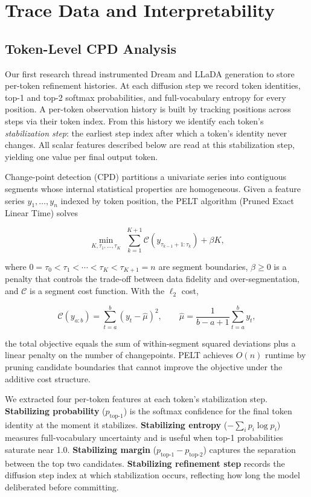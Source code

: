\documentclass[11pt]{article}
\begin{document}
\section{Trace Data and Interpretability}

\subsection{Token-Level CPD Analysis}

Our first research thread instrumented Dream and LLaDA generation to store per-token refinement histories. At each diffusion step we record token identities, top-1 and top-2 softmax probabilities, and full-vocabulary entropy for every position. A per-token observation history is built by tracking positions across steps via their token index. From this history we identify each token's \emph{stabilization step}: the earliest step index after which a token's identity never changes. All scalar features described below are read at this stabilization step, yielding one value per final output token.

Change-point detection (CPD) partitions a univariate series into contiguous segments whose internal statistical properties are homogeneous. Given a feature series \(y_1,\dots,y_n\) indexed by token position, the PELT algorithm (Pruned Exact Linear Time) solves

\[
\min_{K,\tau_1,\dots,\tau_K}\; \sum_{k=1}^{K+1} \mathcal{C}(y_{\tau_{k-1}+1:\tau_k}) + \beta K,
\]

where \(0=\tau_0<\tau_1<\cdots<\tau_K<\tau_{K+1}=n\) are segment boundaries, \(\beta\ge 0\) is a penalty that controls the trade-off between data fidelity and over-segmentation, and \(\mathcal{C}\) is a segment cost function. With the \(\ell_2\) cost,

\[
\mathcal{C}(y_{a:b}) = \sum_{t=a}^b (y_t - \hat\mu)^2,\qquad
\hat\mu = \frac{1}{b-a+1}\sum_{t=a}^b y_t,
\]

the total objective equals the sum of within-segment squared deviations plus a linear penalty on the number of changepoints. PELT achieves \(O(n)\) runtime by pruning candidate boundaries that cannot improve the objective under the additive cost structure.

We extracted four per-token features at each token's stabilization step.
\textbf{Stabilizing probability} (\(p_{\text{top-1}}\)) is the softmax confidence for the final token identity at the moment it stabilizes.
\textbf{Stabilizing entropy} (\(-\sum_i p_i\log p_i\)) measures full-vocabulary uncertainty and is useful when top-1 probabilities saturate near 1.0.
\textbf{Stabilizing margin} (\(p_{\text{top-1}} - p_{\text{top-2}}\)) captures the separation between the top two candidates.
\textbf{Stabilizing refinement step} records the diffusion step index at which stabilization occurs, reflecting how long the model deliberated before committing.
\end{document}
